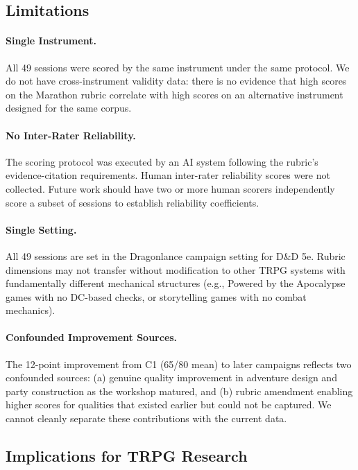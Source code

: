 \subsection{Limitations}

\paragraph{Single Instrument.}
All 49 sessions were scored by the same instrument under the same protocol. We do not
have cross-instrument validity data: there is no evidence that high scores on the Marathon
rubric correlate with high scores on an alternative instrument designed for the same corpus.

\paragraph{No Inter-Rater Reliability.}
The scoring protocol was executed by an AI system following the rubric's evidence-citation
requirements. Human inter-rater reliability scores were not collected. Future work should
have two or more human scorers independently score a subset of sessions to establish
reliability coefficients.

\paragraph{Single Setting.}
All 49 sessions are set in the Dragonlance campaign setting for D\&D 5e. Rubric
dimensions may not transfer without modification to other TRPG systems with fundamentally
different mechanical structures (e.g., Powered by the Apocalypse games with no DC-based
checks, or storytelling games with no combat mechanics).

\paragraph{Confounded Improvement Sources.}
The 12-point improvement from C1 (65/80 mean) to later campaigns reflects two
confounded sources: (a) genuine quality improvement in adventure design and party
construction as the workshop matured, and (b) rubric amendment enabling higher scores
for qualities that existed earlier but could not be captured. We cannot cleanly separate
these contributions with the current data.

\subsection{Implications for TRPG Research}

